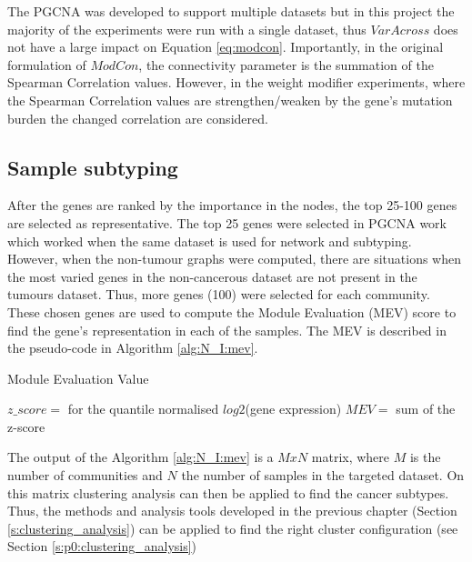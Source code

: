 The PGCNA was developed to support multiple datasets but in this project the majority of the experiments were run with a single dataset, thus $VarAcross$ does not have a large impact on Equation \ref{eq:modcon}. Importantly, in the original formulation of $ModCon$, the connectivity parameter is the summation of the Spearman Correlation values. However, in the weight modifier experiments, where the Spearman Correlation values are strengthen/weaken by the gene's mutation burden the changed correlation are considered.

\subsection{Sample subtyping} \label{s:N_I:mev}

After the genes are ranked by the importance in the nodes, the top 25-100 genes are selected as representative. The top 25 genes were selected in PGCNA work \cite{Care2019-ij} which worked when the same dataset is used for network and subtyping. However, when the non-tumour graphs were computed, there are situations when the most varied genes in the non-cancerous dataset are not present in the tumours dataset. Thus, more genes (100) were selected for each community. These chosen genes are used to compute the Module Evaluation (MEV) score \citet{Care2019-ij} to find the gene's representation in each of the samples. The MEV is described in the pseudo-code in Algorithm \ref{alg:N_I:mev}.

\begin{algorithm}
\caption{Module Evaluation Value }\label{alg:N_I:mev}
    \begin{algorithmic}
            \State $z\_score=$ for the quantile normalised $log2$(gene expression)
                \State $MEV=$ sum of the z-score  
            \EndFor
        \EndFor
    \EndFor
    \end{algorithmic}
\end{algorithm}

The output of the Algorithm \ref{alg:N_I:mev} is a $MxN$ matrix, where $M$ is the number of communities and $N$ the number of samples in the targeted dataset. On this matrix clustering analysis can then be applied to find the cancer subtypes. Thus, the methods and analysis tools developed in the previous chapter (Section \ref{s:clustering_analysis}) can be applied to find the right cluster configuration (see Section \ref{s:p0:clustering_analysis})
